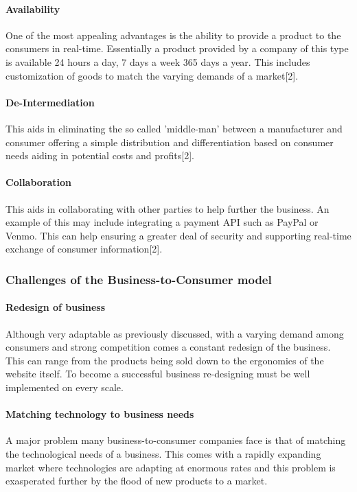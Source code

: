 \paragraph{Availability}One of the most appealing advantages is the ability to provide a product to the consumers in real-time. Essentially a product provided by a company of this type is available 24 hours a day, 7 days a week 365 days a year. This includes customization of goods to match the varying demands of a market[2].

\paragraph{De-Intermediation}This aids in eliminating the so called 'middle-man' between a manufacturer and consumer offering a simple distribution and differentiation based on consumer needs aiding in potential costs and profits[2].

\paragraph{Collaboration}This aids in collaborating with other parties to help further the business. An example of this may include integrating a payment API such as PayPal or Venmo. This can help ensuring a greater deal of security and supporting real-time exchange of consumer information[2].

\subsubsection{Challenges of the Business-to-Consumer model}
\paragraph{Redesign of business}Although very adaptable as previously discussed, with a varying demand among consumers and strong competition comes a constant redesign of the business. This can range from the products being sold down to the ergonomics of the website itself. To become a successful business re-designing must be well implemented on every scale.

\paragraph{Matching technology to business needs}A major problem many business-to-consumer companies face is that of matching the technological needs of a business. This comes with a rapidly expanding market where technologies are adapting at enormous rates and this problem is exasperated further by the flood of new products to a market. 



